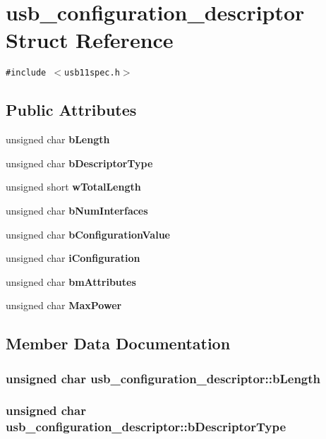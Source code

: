 \section{usb\_\-configuration\_\-descriptor Struct Reference}
\label{structusb__configuration__descriptor}
{\tt \#include $<$usb11spec.h$>$}

\subsection*{Public Attributes}
\begin{CompactItemize}
\item 
unsigned char {\bf b\-Length}
\item 
unsigned char {\bf b\-Descriptor\-Type}
\item 
unsigned short {\bf w\-Total\-Length}
\item 
unsigned char {\bf b\-Num\-Interfaces}
\item 
unsigned char {\bf b\-Configuration\-Value}
\item 
unsigned char {\bf i\-Configuration}
\item 
unsigned char {\bf bm\-Attributes}
\item 
unsigned char {\bf Max\-Power}
\end{CompactItemize}


\subsection{Member Data Documentation}
\subsubsection{\setlength{\rightskip}{0pt plus 5cm}unsigned char {\bf usb\_\-configuration\_\-descriptor::b\-Length}}\label{structusb__configuration__descriptor_a69a7e31b3d5d3a5085ad2bc8fc1837a}


\subsubsection{\setlength{\rightskip}{0pt plus 5cm}unsigned char {\bf usb\_\-configuration\_\-descriptor::b\-Descriptor\-Type}}\label{structusb__configuration__descriptor_7be5d136f0d8318b07a2c17bc55e4924}


